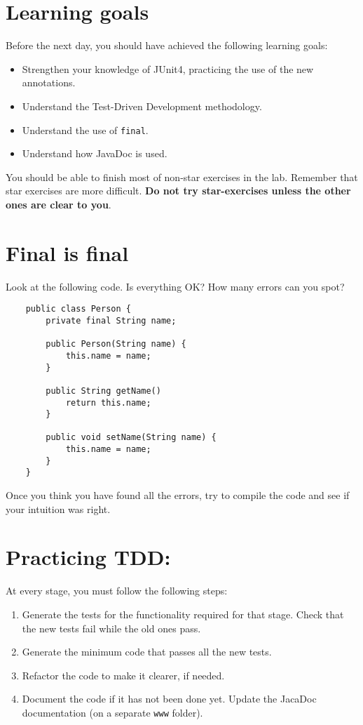 \documentclass{article}
\begin{document}
\section*{Learning goals}
\label{sec:learning-goals}

Before the next day, you should have achieved the following learning
goals: 

\begin{itemize}
\item Strengthen your knowledge of JUnit4, practicing the use of the
  new annotations.
\item Understand the Test-Driven Development methodology. 
\item Understand the use of \verb+final+.
\item Understand how JavaDoc is used.
\end{itemize}

You should be able to finish most of non-star exercises in the lab. 
Remember that star exercises are more difficult. 
\textbf{Do not try star-exercises unless the other ones are clear to
  you}.  

\section{Final is final}
\label{sec:final-final}

Look at the following code. Is everything OK? How many errors can you spot?

\begin{verbatim}
    public class Person {
        private final String name;

        public Person(String name) {
            this.name = name;
        }

        public String getName()
            return this.name;
        }

        public void setName(String name) {
            this.name = name;
        }
    }
\end{verbatim}

Once you think you have found all the errors, try to compile the code
and see if your intuition was right. 

\section{Practicing TDD: }
\label{sec:jj}

At every stage, you must follow the following steps: 

\begin{enumerate}
\item Generate the tests for the functionality required for that
  stage. Check that the new tests fail while the old ones pass.
\item Generate the minimum code that passes all the new tests.
\item Refactor the code to make it clearer, if needed.
\item Document the
  code if it has not been done yet. Update the JacaDoc documentation
  (on a separate \verb+www+ folder). 
\end{enumerate}
\end{document}
